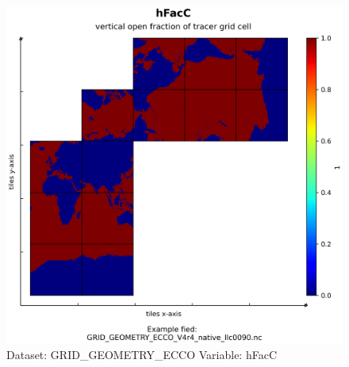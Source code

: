 \begin{figure}[H]
\centering
\includegraphics[scale=0.55]{../images/plots/native_plots_coords/Geometry_Parameters_for_the_Lat-Lon-Cap_90_(llc90)_Native_Model_Grid_(Version_4_Release_4)/hFacC.png}
\caption{Dataset: GRID\_GEOMETRY\_ECCO Variable: hFacC}
\label{tab:table-GRID_GEOMETRY_ECCO_hFacC-Plot}
\end{figure}
\pagebreak

